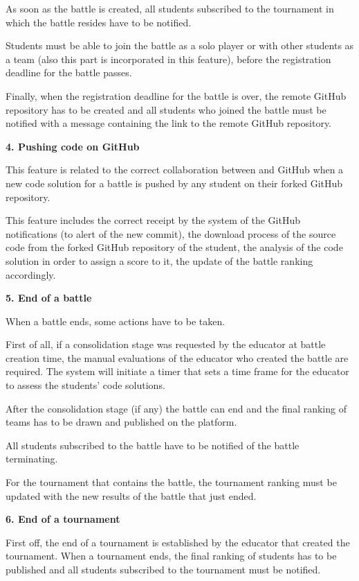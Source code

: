 As soon as the battle is created, all students subscribed to the tournament in which the battle resides have to be notified.

Students must be able to join the battle as a solo player or with other students as a team (also this part is incorporated in this feature), before the registration deadline for the battle passes.

Finally, when the registration deadline for the battle is over, the remote GitHub repository has to be created and all students who joined the battle must be notified with a message containing the link to the remote GitHub repository.

\textbf{4. Pushing code on GitHub}

This feature is related to the correct collaboration between \app and GitHub when a new code solution for a battle is pushed by any student on their forked GitHub repository.

This feature includes the correct receipt by the system of the GitHub notifications (to alert \app of the new commit), the download process of the source code from the forked GitHub repository of the student, the analysis of the code solution in order to assign a score to it, the update of the battle ranking accordingly.

\textbf{5. End of a battle}

When a battle ends, some actions have to be taken. 

First of all, if a consolidation stage was requested by the educator at battle creation time, the manual evaluations of the educator who created the battle are required. The \app system will initiate a timer that sets a time frame for the educator to assess the students' code solutions.

After the consolidation stage (if any) the battle can end and the final ranking of teams has to be drawn and published on the platform.

All students subscribed to the battle have to be notified of the battle terminating.

For the tournament that contains the battle, the tournament ranking must be updated with the new results of the battle that just ended.

\textbf{6. End of a tournament}

First off, the end of a tournament is established by the educator that created the tournament. When a tournament ends, the final ranking of students has to be published and all students subscribed to the tournament must be notified.







